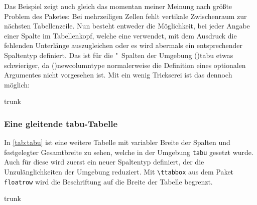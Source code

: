 \documentclass[%
  english,ngerman,%
  cdgeometry=no,DIV=12,%
  cd=false,cdfont=false,cdtitle=true,%
  headings=normal,%
  automark,%
  listof=toc,%
]{tudscrartcl}
\begin{document}
Das Beispiel zeigt auch gleich das momentan meiner Meinung nach größte Problem 
des Paketes: Bei mehrzeiligen Zellen fehlt vertikale Zwischenraum zur nächsten 
Tabellenzeile. Nun besteht entweder die Möglichkeit, bei jeder Angabe einer 
Spalte im Tabellenkopf, welche eine  verwendet, mit dem Ausdruck 
 die fehlenden Unterlänge auszugleichen 
oder es wird abermals ein entsprechender Spaltentyp definiert. Das ist für 
die "~Spalten der Umgebung \Environment(){tabu} etwas 
schwieriger, da \Macro(){newcolumntype} normalerweise die 
Definition eines optionalen Argumentes nicht vorgesehen ist. Mit ein wenig 
Trickserei ist das dennoch möglich:
%
\begin{Code}[nolst]{trunk}
\subsubsection{Eine gleitende tabu-Tabelle}

In \autoref{tab:tabu} ist eine weitere Tabelle mit variabler Breite der 
Spalten und festgelegter Gesamtbreite zu sehen, welche in der Umgebung 
\texttt{tabu} gesetzt wurde. Auch für diese wird zuerst ein neuer 
Spaltentyp definiert, der die Unzulänglichkeiten der Umgebung reduziert. 
Mit \texttt{\textbackslash ttabbox} aus dem Paket \texttt{floatrow} wird 
die Beschriftung auf die Breite der Tabelle begrenzt.

\end{Code}
\CodeHook{\renewcommand*\newcolumntype[2]{}}
\begin{Code}[input]{trunk}
\makeatletter
\newcolumntype{Z}{}
\renewcommand*\NC@rewrite@Z[1][]{%
  \NC@find>{\hspace{0pt}}X[#1]<{\@finalstrut\@arstrutbox}%
}
\makeatother

\end{Code}
\end{document}
